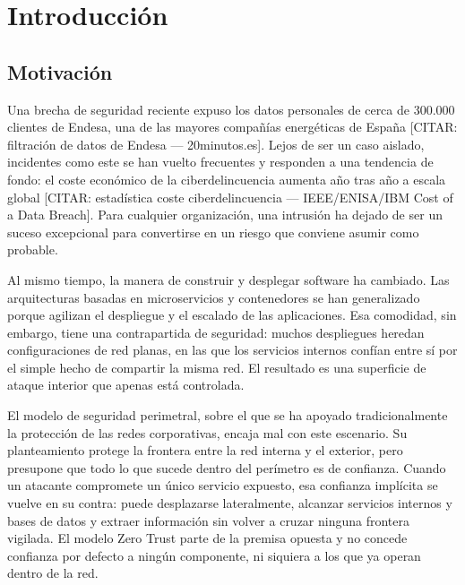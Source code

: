 \documentclass[11pt,spanish,listoffigures,listoftables]{tfgetsinf}
\begin{document}

\mainmatter


\chapter{Introducci\'on}


    \section{Motivaci\'on}
    Una brecha de seguridad reciente expuso los datos personales de cerca de 300.000 clientes de Endesa, una de las mayores compañías energéticas de España [CITAR: filtración de datos de Endesa — 20minutos.es]. Lejos de ser un caso aislado, incidentes como este se han vuelto frecuentes y responden a una tendencia de fondo: el coste económico de la ciberdelincuencia aumenta año tras año a escala global [CITAR: estadística coste ciberdelincuencia — IEEE/ENISA/IBM Cost of a Data Breach]. Para cualquier organización, una intrusión ha dejado de ser un suceso excepcional para convertirse en un riesgo que conviene asumir como probable.

    Al mismo tiempo, la manera de construir y desplegar software ha cambiado. Las arquitecturas basadas en microservicios y contenedores se han generalizado porque agilizan el despliegue y el escalado de las aplicaciones. Esa comodidad, sin embargo, tiene una contrapartida de seguridad: muchos despliegues heredan configuraciones de red planas, en las que los servicios internos confían entre sí por el simple hecho de compartir la misma red. El resultado es una superficie de ataque interior que apenas está controlada.
    
    El modelo de seguridad perimetral, sobre el que se ha apoyado tradicionalmente la protección de las redes corporativas, encaja mal con este escenario. Su planteamiento protege la frontera entre la red interna y el exterior, pero presupone que todo lo que sucede dentro del perímetro es de confianza. Cuando un atacante compromete un único servicio expuesto, esa confianza implícita se vuelve en su contra: puede desplazarse lateralmente, alcanzar servicios internos y bases de datos y extraer información sin volver a cruzar ninguna frontera vigilada. El modelo Zero Trust parte de la premisa opuesta y no concede confianza por defecto a ningún componente, ni siquiera a los que ya operan dentro de la red.
    
\end{document}
